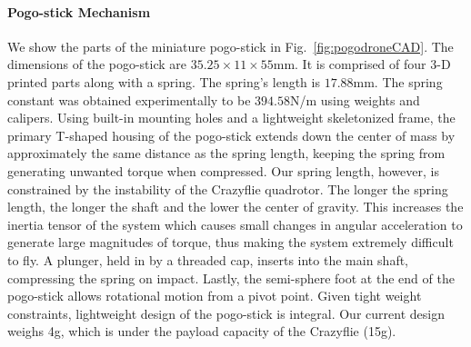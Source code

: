 \documentclass[letterpaper,10pt,conference]{ieeeconf}
\newcommand{\david}[1]{{\color{blue}#1}}
\newcommand{\brian}[1]{{\color{brown}#1}}
\begin{document}
\paragraph{Pogo-stick Mechanism}
We show the parts of the miniature pogo-stick in Fig.~\ref{fig:pogodroneCAD}. 
The dimensions of the pogo-stick are $35.25\times11\times55$mm. It is comprised of four 3-D printed parts along with a spring.
The spring's length is $17.88$mm. 
The spring constant was obtained experimentally to be $394.58$N/m using weights and calipers. Using built-in mounting holes and a lightweight skeletonized frame, the primary T-shaped housing of the pogo-stick extends down the center of mass by approximately the same distance as the spring length, keeping the spring from generating unwanted torque when compressed. Our spring length, however, is constrained by the instability of the Crazyflie quadrotor. The longer the spring length, the longer the shaft and the lower the center of gravity. This increases the inertia tensor of the system which causes small changes in angular acceleration to generate large magnitudes of torque, thus making the system extremely difficult to fly. 
A plunger, held in by a threaded cap, inserts into the main shaft, compressing the spring on impact. Lastly, the semi-sphere foot at the end of the pogo-stick allows rotational motion from a pivot point. Given tight weight constraints, lightweight design of the pogo-stick is integral. Our current design weighs 4g, which is under the payload capacity of the Crazyflie (15g).



\end{document}
